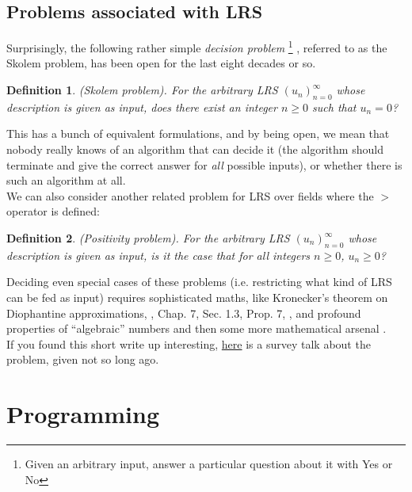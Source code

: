 \documentclass[a4paper,12pt]{article}
\newtheorem{definition}{Definition}
\numberwithin{definition}{section}
\numberwithin{mytheorem}{subsection}
\begin{document}
\subsection{Problems associated with LRS}

Surprisingly, the following rather simple \emph{decision problem} \footnote{Given an arbitrary input, answer a particular question about it with Yes or No} , referred to as the Skolem problem,
has been open for the last eight decades or so.\\

\begin{definition}
\emph{(Skolem problem)}. For the arbitrary LRS $(u_n)^\infty_{n=0}$ whose description is given as
input, does there exist an integer $n \geq 0$ such that $u_n = 0$?
\end{definition}
This has a bunch of equivalent formulations, and by being open, we mean that nobody really knows of an algorithm that can decide it (the algorithm should terminate and give the correct
answer for \emph{all} possible inputs), or whether there is such an algorithm at all.\\
We can also consider another related problem for LRS over fields where the $>$ operator is defined:\\
\begin{definition}
\emph{(Positivity problem)}. For the arbitrary LRS $(u_n)^\infty_{n=0}$ whose description is given as
input, is it the case that for all integers $n \geq 0$, $u_n \geq 0$?
\end{definition}
Deciding even special cases of these problems (i.e. restricting what kind of LRS can be fed as
input) requires sophisticated maths, like Kronecker’s theorem on Diophantine approximations, \cite{N. Bourbaki}, Chap. 7, Sec. 1.3, Prop. 7,
, and profound properties of “algebraic” numbers \cite{M. Mignotte} and then some
more mathematical arsenal \cite{J. P. Bell, James Renegar}.\\
If you found this short write up interesting, \hyperlink{https://fmindia.cmi.ac.in/update2013/presentations/S-Akshay.pdf}{here} is a survey talk about the problem, given not so
long ago.
\newpage



\section{Programming}
\end{document}
